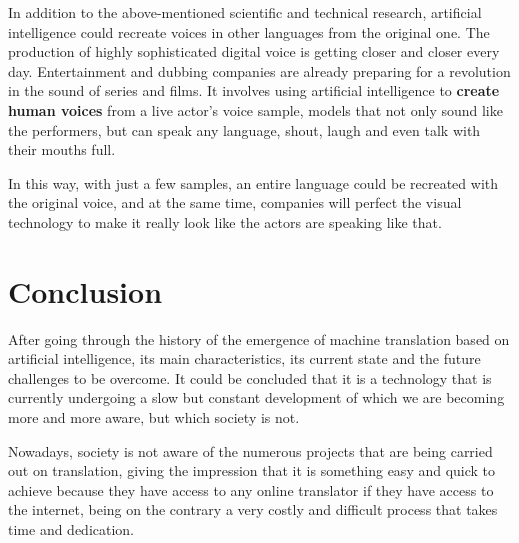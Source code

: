 \documentclass[a4paper]{article}
\theoremstyle{plain}
\theoremstyle{definition}
\begin{document}
In addition to the above-mentioned scientific and technical research, artificial intelligence could recreate voices in other languages from the original one. The production of highly sophisticated digital voice is getting closer and closer every day. Entertainment and dubbing companies are already preparing for a revolution in the sound of series and films. It involves using artificial intelligence to \textbf{create human voices} from a live actor's voice sample, models that not only sound like the performers, but can speak any language, shout, laugh and even talk with their mouths full.\newline

In this way, with just a few samples, an entire language could be recreated with the original voice, and at the same time, companies will perfect the visual technology to make it really look like the actors are speaking like that.


	
	\section{Conclusion}

	After going through the history of the emergence of machine translation based on artificial intelligence, its main characteristics, its current state and the future challenges to be overcome. It could be concluded that it is a technology that is currently undergoing a slow but constant development of which we are becoming more and more aware, but which society is not.\newline
	
    Nowadays, society is not aware of the numerous projects that are being carried out on translation, giving the impression that it is something easy and quick to achieve because they have access to any online translator if they have access to the internet, being on the contrary a very costly and difficult process that takes time and dedication.

	
	

	
	\newpage
    \usepackage{biblatex}
\end{document}
